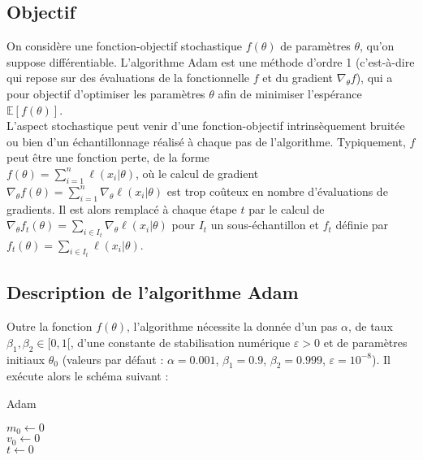 \documentclass[11pt,a4paper, french]{article}
\newcommand{\dsum}[2]{\displaystyle\sum_{#1}^{#2}}
\begin{document}
\subsection{Objectif}
On considère une fonction-objectif stochastique $f(\theta)$ de paramètres $\theta$, qu'on suppose différentiable. L'algorithme Adam est une méthode d'ordre 1 (c'est-à-dire qui repose sur des évaluations de la fonctionnelle $f$ et du gradient $\nabla_{\theta}f$), qui a pour objectif d'optimiser les paramètres $\theta$ afin de minimiser l'espérance $\mathbb E[f(\theta)]$. \\
L'aspect stochastique peut venir d'une fonction-objectif intrinsèquement bruitée ou bien d'un échantillonnage réalisé à chaque pas de l'algorithme. Typiquement, $f$ peut être une fonction perte, de la forme \\$f(\theta)=\dsum{i=1}n\ell(x_i|\theta)$, où le calcul de gradient $\nabla_{\theta}f(\theta)=\dsum{i=1}n\nabla_{\theta}\ell(x_i|\theta)$ est trop coûteux en nombre d'évaluations de gradients. Il est alors remplacé à chaque étape $t$ par le calcul de $\nabla_{\theta}f_t(\theta)=\dsum{i\in I_t}{}\nabla_{\theta}\ell(x_i|\theta)$ pour $I_t$ un sous-échantillon  et $f_t$ définie par $f_t(\theta)=\dsum{i\in I_t}{}\ell(x_i|\theta)$.

\subsection{Description de l'algorithme Adam}

Outre la fonction $f(\theta)$, l'algorithme nécessite la donnée d'un pas $\alpha$, de taux $\beta_1,\beta_2\in[0,1[$, d'une constante de stabilisation numérique $\varepsilon>0$ et de paramètres initiaux $\theta_0$ (valeurs par défaut : $\alpha=0.001$, $\beta_1=0.9$, $\beta_2=0.999$, $\varepsilon=10^{-8}$). Il exécute alors le schéma suivant :


\begin{algorithm}
  \caption{Adam}
  $m_0\longleftarrow 0$ \\
  $v_0\longleftarrow 0$ \\  
  $t\longleftarrow 0$ \\
\end{algorithm}
\end{document}
